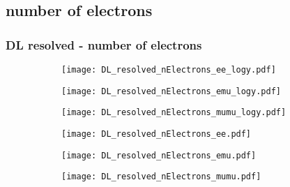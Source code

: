 \documentclass[aspectratio=169,8pt]{beamer}
\begin{document}
\subsection{number of electrons}
\begin{frame}
\frametitle{DL resolved - number of electrons}
\begin{figure}
\captionsetup[subfigure]{labelformat=empty}
\begin{subfigure}{0.32\textwidth}
\texttt{[image: DL\_resolved\_nElectrons\_ee\_logy.pdf]}
\vspace*{-0.15cm}
\end{subfigure}
\hfil
\begin{subfigure}{0.32\textwidth}
\texttt{[image: DL\_resolved\_nElectrons\_emu\_logy.pdf]}
\vspace*{-0.15cm}
\end{subfigure}
\hfil
\begin{subfigure}{0.32\textwidth}
\texttt{[image: DL\_resolved\_nElectrons\_mumu\_logy.pdf]}
\vspace*{-0.15cm}
\end{subfigure}
\hfil
\begin{subfigure}{0.32\textwidth}
\texttt{[image: DL\_resolved\_nElectrons\_ee.pdf]}
\vspace*{-0.15cm}
\end{subfigure}
\hfil
\begin{subfigure}{0.32\textwidth}
\texttt{[image: DL\_resolved\_nElectrons\_emu.pdf]}
\vspace*{-0.15cm}
\end{subfigure}
\hfil
\begin{subfigure}{0.32\textwidth}
\texttt{[image: DL\_resolved\_nElectrons\_mumu.pdf]}
\vspace*{-0.15cm}
\end{subfigure}
\hfil
\end{figure}
\end{frame}
\newpage
\end{document}
